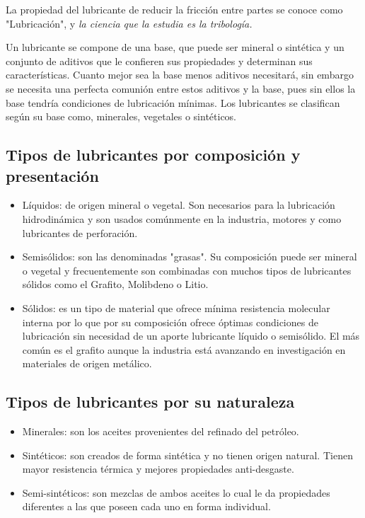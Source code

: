 \documentclass[../main]{subfiles}
\begin{document}
La propiedad del lubricante de reducir la fricción entre partes se conoce como "Lubricación", y \emph{la ciencia que la estudia es la tribología.}

Un lubricante se compone de una base, que puede ser mineral o sintética y un conjunto de aditivos que le confieren sus propiedades y determinan sus características. Cuanto mejor sea la base menos aditivos necesitará, sin embargo se necesita una perfecta comunión entre estos aditivos y la base, pues sin ellos la base tendría condiciones de lubricación mínimas. Los lubricantes se clasifican según su base como, minerales, vegetales o sintéticos.

\subsection{Tipos de lubricantes por composición y presentación }
\begin{itemize}
     
\item Líquidos: de origen mineral o vegetal. Son necesarios para la lubricación hidrodinámica y son usados comúnmente en la industria, motores y como lubricantes de perforación.
\item Semisólidos: son las denominadas "grasas". Su composición puede ser mineral o vegetal y frecuentemente son combinadas con muchos tipos de lubricantes sólidos como el Grafito, Molibdeno o Litio.
\item Sólidos: es un tipo de material que ofrece mínima resistencia molecular interna por lo que por su composición ofrece óptimas condiciones de lubricación sin necesidad de un aporte lubricante líquido o semisólido. El más común es el grafito aunque la industria está avanzando en investigación en materiales de origen metálico.
\end{itemize}

\subsection{Tipos de lubricantes por su naturaleza }
\begin{itemize}
\item Minerales: son los aceites provenientes del refinado del petróleo.
\item Sintéticos: son creados de forma sintética y no tienen origen natural. Tienen mayor resistencia térmica y mejores propiedades anti-desgaste.
\item  Semi-sintéticos: son mezclas de ambos aceites lo cual le da propiedades diferentes a las que poseen cada uno en forma individual.
\end{itemize}
\end{document}
